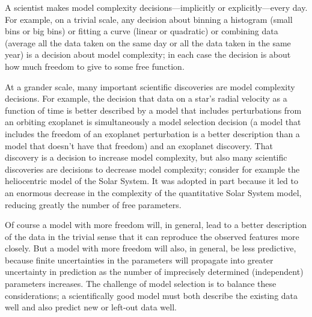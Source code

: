 \documentclass[12pt,twoside]{article}
\begin{document}
A scientist makes model complexity decisions---implicitly or
explicitly---every day.  For example, on a trivial scale, any decision
about binning a histogram (small bins or big bins) or fitting a curve
(linear or quadratic) or combining data (average all the data taken on
the same day or all the data taken in the same year) is a decision
about model complexity; in each case the decision is about how much
freedom to give to some free function.

At a grander scale, many important scientific discoveries are model
complexity decisions.  For example, the decision that data on a star's
radial velocity as a function of time is better described by a model
that includes perturbations from an orbiting exoplanet is
simultaneously a model selection decision (a model that includes the
freedom of an exoplanet perturbation is a better description than a
model that doesn't have that freedom) and an exoplanet discovery.
That discovery is a decision to increase model complexity, but also
many scientific discoveries are decisions to decrease model
complexity; consider for example the heliocentric model of the Solar
System.  It was adopted in part because it led to an enormous decrease
in the complexity of the quantitative Solar System model, reducing
greatly the number of free parameters.

Of course a model with more freedom will, in general, lead to a better
description of the data in the trivial sense that it can reproduce the
observed features more closely.  But a model with more freedom will
also, in general, be less predictive, because finite uncertainties in
the parameters will propagate into greater uncertainty in prediction
as the number of imprecisely determined (independent) parameters
increases.  The challenge of model selection is to balance these
considerations; a scientifically good model must both describe the
existing data well and also predict new or left-out data well.
\end{document}
